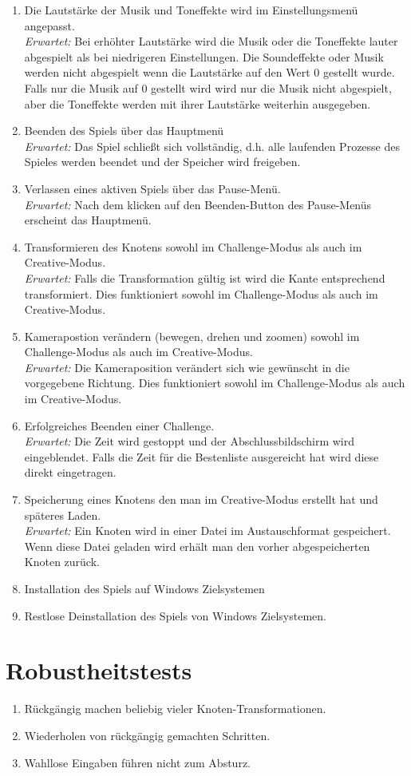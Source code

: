\begin{enumerate}
\item Die Lautstärke der Musik und Toneffekte wird im Einstellungsmenü angepasst. \\  
\textit{Erwartet:} Bei erhöhter Lautstärke wird die Musik oder die Toneffekte lauter abgespielt als bei niedrigeren Einstellungen. Die Soundeffekte oder Musik werden nicht abgespielt wenn die Lautstärke auf den Wert 0 gestellt wurde. Falls nur die Musik auf 0 gestellt wird wird nur die Musik nicht abgespielt, aber die Toneffekte werden mit ihrer Lautstärke weiterhin ausgegeben.
\item Beenden des Spiels über das Hauptmenü\\
\textit{Erwartet:} Das Spiel schließt sich vollständig, d.h. alle laufenden Prozesse des Spieles werden beendet und der Speicher wird freigeben.
\item Verlassen eines aktiven Spiels über das Pause-Menü.\\
\textit{Erwartet:} Nach dem klicken auf den Beenden-Button des Pause-Menüs erscheint das Hauptmenü.
\item Transformieren des Knotens sowohl im Challenge-Modus als auch im Creative-Modus.\\
\textit{Erwartet:} Falls die Transformation gültig ist wird die Kante entsprechend transformiert. Dies funktioniert sowohl im Challenge-Modus als auch im Creative-Modus.
\item Kamerapostion verändern (bewegen, drehen und zoomen) sowohl im Challenge-Modus als auch im Creative-Modus.\\
\textit{Erwartet:} Die Kameraposition verändert sich wie gewünscht in die vorgegebene Richtung. Dies funktioniert sowohl im Challenge-Modus als auch im Creative-Modus.
\item Erfolgreiches Beenden einer Challenge. \\
\textit{Erwartet:} Die Zeit wird gestoppt und der Abschlussbildschirm wird eingeblendet. Falls die Zeit für die Bestenliste ausgereicht hat wird diese direkt eingetragen.
\item Speicherung eines Knotens den man im Creative-Modus erstellt hat und späteres Laden.\\
\textit{Erwartet:} Ein Knoten wird in einer Datei im Austauschformat gespeichert. Wenn diese Datei geladen wird erhält man den vorher abgespeicherten Knoten zurück.
\item Installation des Spiels auf Windows Zielsystemen
\item Restlose Deinstallation des Spiels von Windows Zielsystemen.

\end{enumerate}


\section{Robustheitstests}


\begin{enumerate}[resume]
\item Rückgängig machen beliebig vieler Knoten-Transformationen. 
\item Wiederholen von rückgängig gemachten Schritten.
\item Wahllose Eingaben führen nicht zum Absturz.
\end{enumerate}



